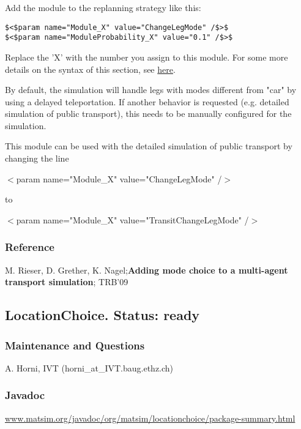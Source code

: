\documentclass[a4paper,11pt]{report}
\begin{document}
Add the module to the replanning strategy like this:
\begin{verbatim}
$<$param name="Module_X" value="ChangeLegMode" /$>$
$<$param name="ModuleProbability_X" value="0.1" /$>$
\end{verbatim}

Replace the 'X' with the number you assign to this module. For some more details on the syntax of this section, see \href{http://matsim.org/node/478}{here}.

By default, the simulation will handle legs with modes different from  "car" by using a delayed teleportation. If another behavior is  requested (e.g. detailed simulation of public transport), this needs to  be manually configured for the simulation.

This module can be used with the detailed simulation of public transport by changing the line

$<$param name="Module\_X" value="ChangeLegMode" /$>$

to

$<$param name="Module\_X" value="TransitChangeLegMode" /$>$

\subsubsection{Reference}

M. Rieser, D. Grether, K. Nagel;\textbf{Adding mode choice to a multi-agent transport simulation}; TRB'09

\subsection{LocationChoice. Status: ready}

\subsubsection{\textbf{Maintenance and Questions}}

A. Horni, IVT (horni\_at\_IVT.baug.ethz.ch)

\subsubsection{\textbf{Javadoc}}

\href{http://www.matsim.org/javadoc/org/matsim/locationchoice/package-summary.html}{www.matsim.org/javadoc/org/matsim/locationchoice/package-summary.html}
\end{document}
